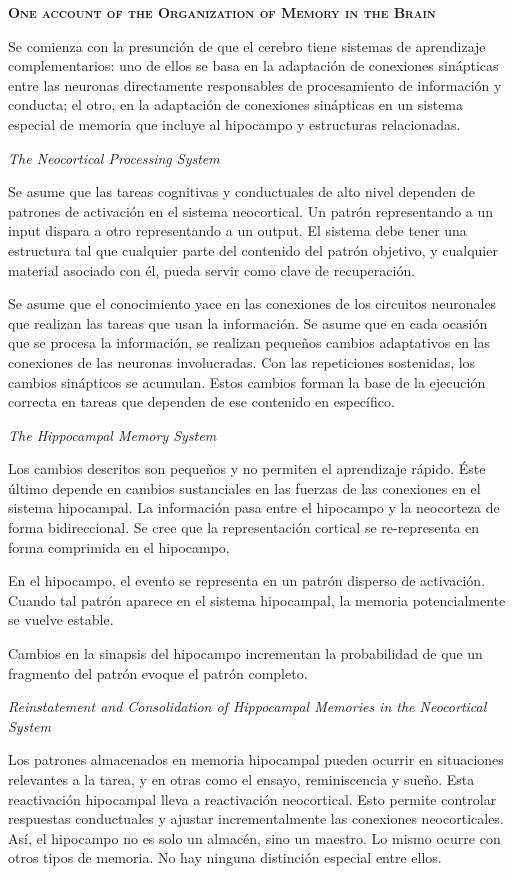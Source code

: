 \documentclass[a4paper,12pt]{article}
\begin{document}
{\scshape\bfseries One account of the Organization of Memory in the Brain}

Se comienza con la presunción de que el cerebro tiene sistemas de aprendizaje complementarios: uno de ellos se basa en la adaptación de conexiones sinápticas entre las neuronas directamente responsables de procesamiento de información y conducta; el otro, en la adaptación de conexiones sinápticas en un sistema especial de memoria que incluye al hipocampo y estructuras relacionadas.

{\itshape The Neocortical Processing System}

Se asume que las tareas cognitivas y conductuales de alto nivel dependen de patrones de activación en el sistema neocortical. Un patrón representando a un input dispara a otro representando a un output. El sistema debe tener una estructura tal que cualquier parte del contenido del patrón objetivo, y cualquier material asociado con él, pueda servir como clave de recuperación.

Se asume que el conocimiento yace en las conexiones de los circuitos neuronales que realizan las tareas que usan la información. Se asume que en cada ocasión que se procesa la información, se realizan pequeños cambios adaptativos en las conexiones de las neuronas involucradas. Con las repeticiones sostenidas, los cambios sinápticos se acumulan. Estos cambios forman la base de la ejecución correcta en tareas que dependen de ese contenido en específico.

{\itshape The Hippocampal Memory System}

Los cambios descritos son pequeños y no permiten el aprendizaje rápido. Éste último depende en cambios sustanciales en las fuerzas de las conexiones en el sistema hipocampal. La información pasa entre el hipocampo y la neocorteza de forma bidireccional. Se cree que la representación cortical se re-representa en forma comprimida en el hipocampo. 

En el hipocampo, el evento se representa en un patrón disperso de activación. Cuando tal patrón aparece en el sistema hipocampal, la memoria potencialmente se vuelve estable.

Cambios en la sinapsis del hipocampo incrementan la probabilidad de que un fragmento del patrón evoque el patrón completo. 

{\itshape Reinstatement and Consolidation of Hippocampal Memories in the Neocortical System}

Los patrones almacenados en memoria hipocampal pueden ocurrir en situaciones relevantes a la tarea, y en otras como el ensayo, reminiscencia y sueño. Esta reactivación hipocampal lleva a reactivación neocortical. Esto permite controlar respuestas conductuales y ajustar incrementalmente las conexiones neocorticales. Así, el hipocampo no es solo un almacén, sino un maestro. Lo mismo ocurre con otros tipos de memoria. No hay ninguna distinción especial entre ellos.
\end{document}

